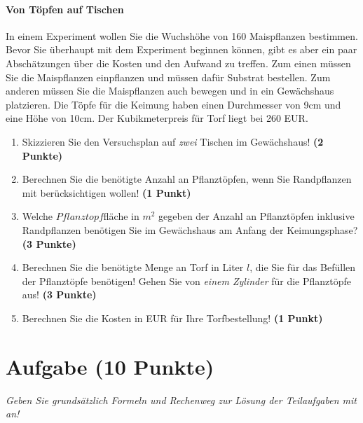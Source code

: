 \documentclass[a4paper, 9pt]{scrartcl}\usepackage[]{graphicx}\usepackage[]{xcolor}
\begin{document}
\paragraph{Von T{\"o}pfen auf Tischen}



In einem Experiment wollen Sie die Wuchsh{\"o}he von 160
Maispflanzen bestimmen. Bevor Sie {\"u}berhaupt mit dem Experiment beginnen
k{\"o}nnen, gibt es aber ein paar Absch{\"a}tzungen {\"u}ber die Kosten und den Aufwand
zu treffen. Zum einen m{\"u}ssen Sie die Maispflanzen einpflanzen und m{\"u}ssen
daf{\"u}r Substrat bestellen. Zum anderen m{\"u}ssen Sie die Maispflanzen auch
bewegen und in ein Gew{\"a}chshaus platzieren. Die T{\"o}pfe f{\"u}r die Keimung haben
einen Durchmesser von 9cm und eine H{\"o}he von 10cm. Der
Kubikmeterpreis f{\"u}r Torf liegt bei 260 EUR.

\begin{enumerate}
\item Skizzieren Sie den Versuchsplan auf \textit{zwei} Tischen im
  Gew{\"a}chshaus! \textbf{(2 Punkte)}
\item Berechnen Sie die ben{\"o}tigte Anzahl an Pflanzt{\"o}pfen, wenn Sie
  Randpflanzen mit ber{\"u}cksichtigen wollen! \textbf{(1 Punkt)}
\item Welche $Pflanztopf$fl{\"a}che in $m^2$ gegeben der Anzahl an
  Pflanzt{\"o}pfen inklusive Randpflanzen ben{\"o}tigen Sie im Gew{\"a}chshaus am
  Anfang der Keimungsphase?  \textbf{(3 Punkte)}
\item Berechnen Sie die ben{\"o}tigte Menge an Torf in Liter $l$, die Sie f{\"u}r
  das Bef{\"u}llen der Pflanzt{\"o}pfe ben{\"o}tigen! Gehen Sie von \textit{einem
    Zylinder} f{\"u}r die Pflanzt{\"o}pfe aus!  \textbf{(3 Punkte)}
\item Berechnen Sie die Kosten in EUR f{\"u}r Ihre Torfbestellung! \textbf{(1
    Punkt)}
\end{enumerate}



 
\clearpage

\section{Aufgabe \hfill (10 Punkte)}

\textit{Geben Sie grunds{\"a}tzlich Formeln und Rechenweg zur L{\"o}sung der
  Teilaufgaben mit an!} \\[1Ex]
\end{document}
